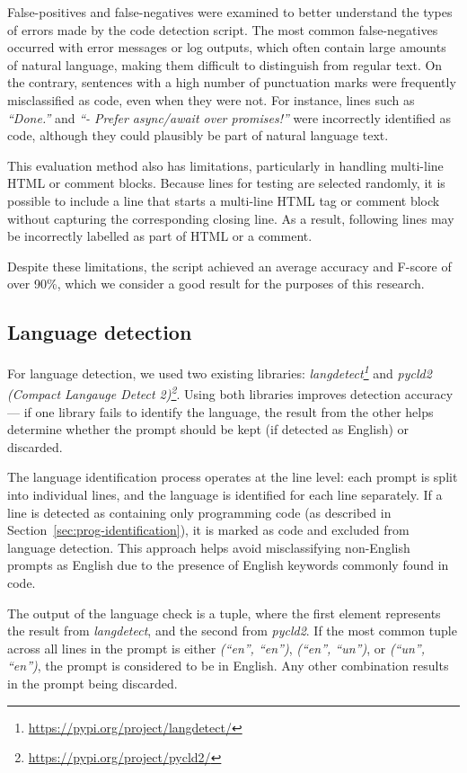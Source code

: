 False-positives and false-negatives were examined to better understand the types of errors made by the code detection script. The most common false-negatives occurred with error messages or log outputs, which often contain large amounts of natural language, making them difficult to distinguish from regular text. On the contrary, sentences with a high number of punctuation marks were frequently misclassified as code, even when they were not. For instance, lines such as \textit{``Done.''} and \textit{``- Prefer async/await over promises!''} were incorrectly identified as code, although they could plausibly be part of natural language text.

This evaluation method also has limitations, particularly in handling multi-line HTML or comment blocks. Because lines for testing are selected randomly, it is possible to include a line that starts a multi-line HTML tag or comment block without capturing the corresponding closing line. As a result, following lines may be incorrectly labelled as part of HTML or a comment.

Despite these limitations, the script achieved an average accuracy and F-score of over 90\%, which we consider a good result for the purposes of this research.

\subsection{Language detection}
For language detection, we used two existing libraries: \textit{langdetect\footnote{\url{https://pypi.org/project/langdetect/}}} and \textit{pycld2 (Compact Langauge Detect 2)\footnote{\url{https://pypi.org/project/pycld2/}}}. Using both libraries improves detection accuracy --- if one library fails to identify the language, the result from the other helps determine whether the prompt should be kept (if detected as English) or discarded.

The language identification process operates at the line level: each prompt is split into individual lines, and the language is identified for each line separately. If a line is detected as containing only programming code (as described in Section~\ref{sec:prog-identification}), it is marked as code and excluded from language detection. This approach helps avoid misclassifying non-English prompts as English due to the presence of English keywords commonly found in code.

The output of the language check is a tuple, where the first element represents the result from \textit{langdetect}, and the second from \textit{pycld2}. If the most common tuple across all lines in the prompt is either \textit{(``en'', ``en'')}, \textit{(``en'', ``un'')}, or \textit{(``un'', ``en'')}, the prompt is considered to be in English. Any other combination results in the prompt being discarded.


